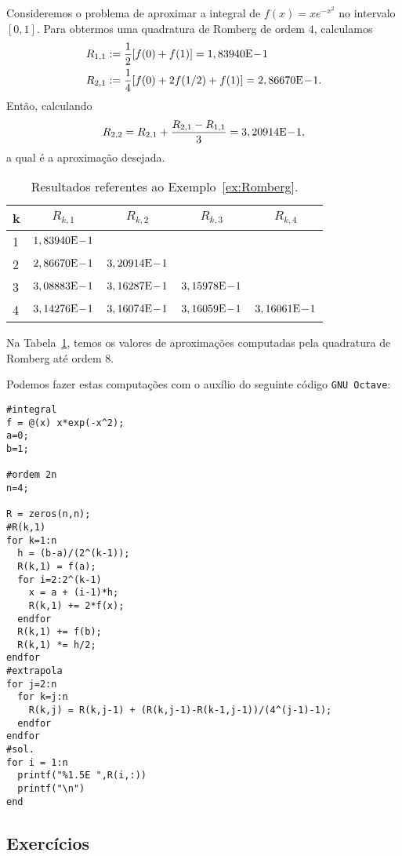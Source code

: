 \begin{ex}\label{ex:Romberg}
  Consideremos o problema de aproximar a integral de $f(x)=xe^{-x^2}$ no intervalo $[0, 1]$. Para obtermos uma quadratura de Romberg de ordem $4$, calculamos
  \begin{align}
    R_{1,1} &:= \frac{1}{2}[f(0) + f(1)] = 1,83940\mathrm{E}\!-\!1\\
    R_{2,1} &:= \frac{1}{4}[f(0) + 2f(1/2) + f(1)] = 2,86670\mathrm{E}\!-\!1.
  \end{align}
Então, calculando
\begin{equation}
  R_{2,2} = R_{2,1} + \frac{R_{2,1}-R_{1,1}}{3} = 3,20914\mathrm{E}\!-\!1,
\end{equation}
a qual é a aproximação desejada.

\begin{table}[h!]
  \centering
  \caption{Resultados referentes ao Exemplo~\ref{ex:Romberg}.}
  \begin{tabular}{l|cccc}
    k & $R_{k,1}$ & $R_{k,2}$ & $R_{k,3}$ & $R_{k,4}$ \\\hline
    1 & $1,83940\mathrm{E}\!-\!1$ \\
    2 & $2,86670\mathrm{E}\!-\!1$ & $3,20914\mathrm{E}\!-\!1$ \\
    3 & $3,08883\mathrm{E}\!-\!1$ & $3,16287\mathrm{E}\!-\!1$ & $3,15978\mathrm{E}\!-\!1$ \\
    4 & $3,14276\mathrm{E}\!-\!1$ & $3,16074\mathrm{E}\!-\!1$ & $3,16059\mathrm{E}\!-\!1$ &  $3,16061\mathrm{E}\!-\!1$\\\hline
  \end{tabular}
  \label{tab:ex_Romberg}
\end{table}

Na Tabela~\ref{tab:ex_Romberg}, temos os valores de aproximações computadas pela quadratura de Romberg até ordem $8$.

\ifisoctave
Podemos fazer estas computações com o auxílio do seguinte código \verb+GNU Octave+:
\begin{verbatim}
#integral
f = @(x) x*exp(-x^2);
a=0;
b=1;

#ordem 2n
n=4;

R = zeros(n,n);
#R(k,1)
for k=1:n
  h = (b-a)/(2^(k-1));
  R(k,1) = f(a);
  for i=2:2^(k-1)
    x = a + (i-1)*h;
    R(k,1) += 2*f(x);
  endfor
  R(k,1) += f(b);
  R(k,1) *= h/2;
endfor
#extrapola
for j=2:n
  for k=j:n
    R(k,j) = R(k,j-1) + (R(k,j-1)-R(k-1,j-1))/(4^(j-1)-1);
  endfor
endfor
#sol.
for i = 1:n 
  printf("%1.5E ",R(i,:))
  printf("\n")
end
\end{verbatim}
\fi
\end{ex}

\subsection*{Exercícios}

